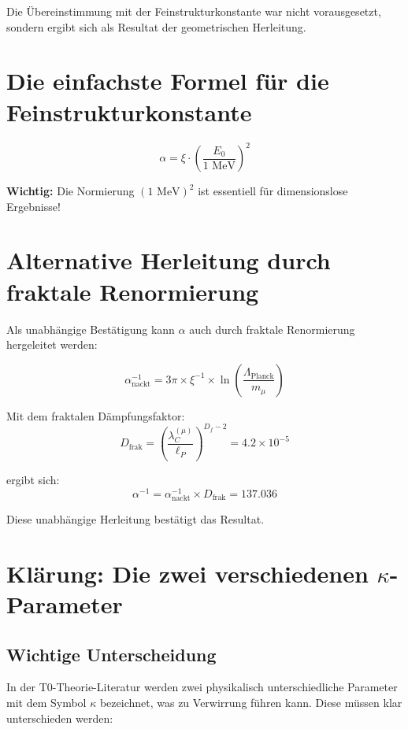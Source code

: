 \documentclass[12pt,a4paper]{article}
\begin{document}
	Die Übereinstimmung mit der Feinstrukturkonstante war nicht vorausgesetzt, sondern ergibt sich als Resultat der geometrischen Herleitung.
	\section*{Die einfachste Formel für die Feinstrukturkonstante}

\[
\boxed{\alpha = \xi \cdot \left(\frac{E_0}{1 \text{ MeV}}\right)^2}
\]
\begin{tcolorbox}[colback=red!5!white,colframe=red!75!black]
	\textbf{Wichtig:} Die Normierung $(1 \text{ MeV})^2$ ist essentiell für dimensionslose Ergebnisse!
\end{tcolorbox}	
	\section{Alternative Herleitung durch fraktale Renormierung}
	
	Als unabhängige Bestätigung kann $\alpha$ auch durch fraktale Renormierung hergeleitet werden:
	
	\begin{equation}
		\alpha_{\text{nackt}}^{-1} = 3\pi \times \xi^{-1} \times \ln\left(\frac{\Lambda_{\text{Planck}}}{m_\mu}\right)
	\end{equation}
	
	Mit dem fraktalen Dämpfungsfaktor:
	\begin{equation}
		D_{\text{frak}} = \left(\frac{\lambda_C^{(\mu)}}{\ell_P}\right)^{D_f-2} = 4.2 \times 10^{-5}
	\end{equation}
	
	ergibt sich:
	\begin{equation}
		\alpha^{-1} = \alpha_{\text{nackt}}^{-1} \times D_{\text{frak}} = 137.036
	\end{equation}
	
	Diese unabhängige Herleitung bestätigt das Resultat.
	
	\section{Klärung: Die zwei verschiedenen $\kappa$-Parameter}
	
	\subsection{Wichtige Unterscheidung}
	
	In der T0-Theorie-Literatur werden zwei physikalisch unterschiedliche Parameter mit dem Symbol $\kappa$ bezeichnet, was zu Verwirrung führen kann. Diese müssen klar unterschieden werden:
	
\end{document}
